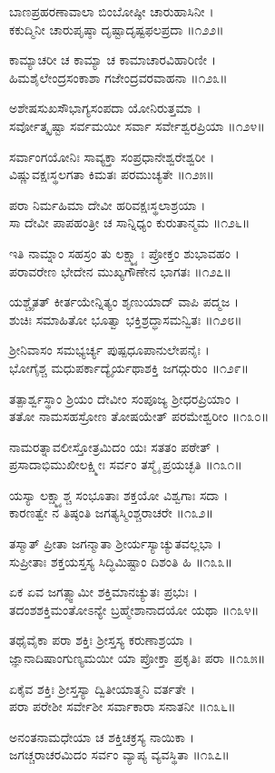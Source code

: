 ಬಾಣಪ್ರಹರಣಾವಾಲಾ ಬಿಂಬೋಷ್ಠೀ ಚಾರುಹಾಸಿನೀ ।\\
ಕಕುದ್ಮಿನೀ ಚಾರುಪೃಷ್ಠಾ ದೃಷ್ಟಾದೃಷ್ಟಫಲಪ್ರದಾ ॥೧೨೨॥

ಕಾಮ್ಯಾಚರೀ ಚ ಕಾಮ್ಯಾ ಚ ಕಾಮಾಚಾರವಿಹಾರಿಣೀ ।\\
ಹಿಮಶೈಲೇಂದ್ರಸಂಕಾಶಾ ಗಜೇಂದ್ರವರವಾಹನಾ ॥೧೨೩॥

ಅಶೇಷಸುಖಸೌಭಾಗ್ಯಸಂಪದಾ ಯೋನಿರುತ್ತಮಾ ।\\
ಸರ್ವೋತ್ಕೃಷ್ಟಾ ಸರ್ವಮಯೀ ಸರ್ವಾ ಸರ್ವೇಶ್ವರಪ್ರಿಯಾ ॥೧೨೪॥

ಸರ್ವಾಂಗಯೋನಿಃ ಸಾವ್ಯಕ್ತಾ ಸಂಪ್ರಧಾನೇಶ್ವರೇಶ್ವರೀ ।\\
ವಿಷ್ಣುವಕ್ಷಃಸ್ಥಲಗತಾ ಕಿಮತಃ ಪರಮುಚ್ಯತೇ ॥೧೨೫॥

ಪರಾ ನಿರ್ಮಹಿಮಾ ದೇವೀ ಹರಿವಕ್ಷಃಸ್ಥಲಾಶ್ರಯಾ ।\\
ಸಾ ದೇವೀ ಪಾಪಹಂತ್ರೀ ಚ ಸಾನ್ನಿಧ್ಯಂ ಕುರುತಾನ್ಮಮ ॥೧೨೬॥

ಇತಿ ನಾಮ್ನಾಂ ಸಹಸ್ರಂ ತು ಲಕ್ಷ್ಮ್ಯಾಃ ಪ್ರೋಕ್ತಂ ಶುಭಾವಹಂ ।\\
ಪರಾವರೇಣ ಭೇದೇನ ಮುಖ್ಯಗೌಣೇನ ಭಾಗತಃ ॥೧೨೭॥

ಯಶ್ಚೈತತ್ ಕೀರ್ತಯೇನ್ನಿತ್ಯಂ ಶೃಣುಯಾದ್ ವಾಪಿ ಪದ್ಮಜ ।\\
ಶುಚಿಃ ಸಮಾಹಿತೋ ಭೂತ್ವಾ ಭಕ್ತಿಶ್ರದ್ಧಾಸಮನ್ವಿತಃ ॥೧೨೮॥

ಶ್ರೀನಿವಾಸಂ ಸಮಭ್ಯರ್ಚ್ಯ ಪುಷ್ಪಧೂಪಾನುಲೇಪನೈಃ ।\\
ಭೋಗೈಶ್ಚ ಮಧುಪರ್ಕಾದ್ಯೈರ್ಯಥಾಶಕ್ತಿ ಜಗದ್ಗುರುಂ ॥೧೨೯॥

ತತ್ಪಾರ್ಶ್ವಸ್ಥಾಂ ಶ್ರಿಯಂ ದೇವೀಂ ಸಂಪೂಜ್ಯ ಶ್ರೀಧರಪ್ರಿಯಾಂ ।\\
ತತೋ ನಾಮಸಹಸ್ರೋಣ ತೋಷಯೇತ್ ಪರಮೇಶ್ವರೀಂ ॥೧೩೦॥

ನಾಮರತ್ನಾವಲೀಸ್ತೋತ್ರಮಿದಂ ಯಃ ಸತತಂ ಪಠೇತ್ ।\\
ಪ್ರಸಾದಾಭಿಮುಖೀಲಕ್ಷ್ಮೀಃ ಸರ್ವಂ ತಸ್ಮೈ ಪ್ರಯಚ್ಛತಿ ॥೧೩೧॥

ಯಸ್ಯಾ ಲಕ್ಷ್ಮ್ಯಾಶ್ಚ ಸಂಭೂತಾಃ ಶಕ್ತಯೋ ವಿಶ್ವಗಾಃ ಸದಾ ।\\
ಕಾರಣತ್ವೇ ನ ತಿಷ್ಠಂತಿ ಜಗತ್ಯಸ್ಮಿಂಶ್ಚರಾಚರೇ ॥೧೩೨॥

ತಸ್ಮಾತ್ ಪ್ರೀತಾ ಜಗನ್ಮಾತಾ ಶ್ರೀರ್ಯಸ್ಯಾಚ್ಯುತವಲ್ಲಭಾ ।\\
ಸುಪ್ರೀತಾಃ ಶಕ್ತಯಸ್ತಸ್ಯ ಸಿದ್ಧಿಮಿಷ್ಟಾಂ ದಿಶಂತಿ ಹಿ ॥೧೩೩॥

ಏಕ ಏವ ಜಗತ್ಸ್ವಾಮೀ ಶಕ್ತಿಮಾನಚ್ಯುತಃ ಪ್ರಭುಃ ।\\
ತದಂಶಶಕ್ತಿಮಂತೋಽನ್ಯೇ ಬ್ರಹ್ಮೇಶಾನಾದಯೋ ಯಥಾ ॥೧೩೪॥

ತಥೈವೈಕಾ ಪರಾ ಶಕ್ತಿಃ ಶ್ರೀಸ್ತಸ್ಯ ಕರುಣಾಶ್ರಯಾ ।\\
ಜ್ಞಾನಾದಿಷಾಂಗುಣ್ಯಮಯೀ ಯಾ ಪ್ರೋಕ್ತಾ ಪ್ರಕೃತಿಃ ಪರಾ ॥೧೩೫॥

ಏಕೈವ ಶಕ್ತಿಃ ಶ್ರೀಸ್ತಸ್ಯಾ ದ್ವಿತೀಯಾತ್ಮನಿ ವರ್ತತೇ ।\\
ಪರಾ ಪರೇಶೀ ಸರ್ವೇಶೀ ಸರ್ವಾಕಾರಾ ಸನಾತನೀ ॥೧೩೬॥

ಅನಂತನಾಮಧೇಯಾ ಚ ಶಕ್ತಿಚಕ್ರಸ್ಯ ನಾಯಿಕಾ ।\\
ಜಗಚ್ಚರಾಚರಮಿದಂ ಸರ್ವಂ ವ್ಯಾಪ್ಯ ವ್ಯವಸ್ಥಿತಾ ॥೧೩೭॥

